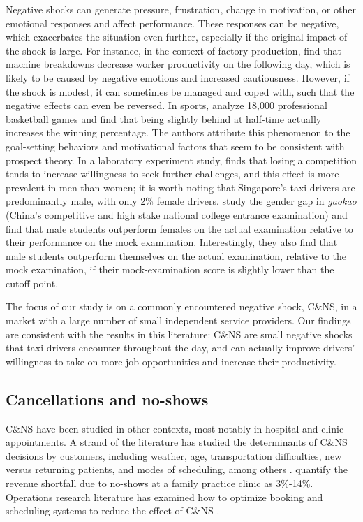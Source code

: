 \documentclass[reviewmode]{restud}
\begin{document}
Negative shocks can generate pressure, frustration, change in motivation, or other emotional responses and affect performance.  These responses can be negative, which exacerbates the situation even further, especially if the original impact of the shock is large. For instance, in the context of factory production, \citet{cai2017recover} find that machine breakdowns decrease worker productivity on the following day, which is likely to be caused by negative emotions and increased cautiousness. However, if the shock is modest, it can sometimes be managed and coped with, such that the negative effects can even be reversed. In sports, \citet{berger2011can} analyze 18,000 professional basketball games and find that being slightly behind at half-time actually increases the winning percentage. The authors attribute this phenomenon to the goal-setting behaviors and motivational factors that seem to be consistent with prospect theory. In a laboratory experiment study, \citet{buser2016impact}  finds that losing a competition tends to increase willingness to seek further challenges, and this effect is more prevalent in men than women; it is worth noting that Singapore's taxi drivers are predominantly male, with only 2\% female drivers. \citet{cai2016gender} study the gender gap in \emph{gaokao} (China's competitive and high stake national college entrance examination) and find that male students outperform females on the actual examination relative to their performance on the mock examination. Interestingly, they also find that male students outperform themselves on the actual examination, relative to the mock examination, if their mock-examination score is slightly lower than the cutoff point. 


The focus of our study is on a commonly encountered negative shock, C\&NS, in a market with a large number of small independent service providers.
Our findings are consistent with the results in this literature: C\&NS are small negative shocks that taxi drivers encounter throughout the day, and can actually improve drivers' willingness to take on more job opportunities and increase their productivity.

\subsection{Cancellations and no-shows}

C\&NS have been studied in other contexts, most notably in hospital and clinic appointments. A strand of the literature has studied the determinants of C\&NS decisions by customers, including weather, age, transportation difficulties, new versus returning patients, and modes of scheduling, among others \citep{norris2014empirical}. \citet{moore2001time} quantify the revenue shortfall due to no-shows at a family practice clinic as 3\%-14\%. Operations research literature has examined how to optimize booking and scheduling systems to reduce the effect of C\&NS \citep{feldman2014appointment,patrick2008reducing}.
\end{document}
